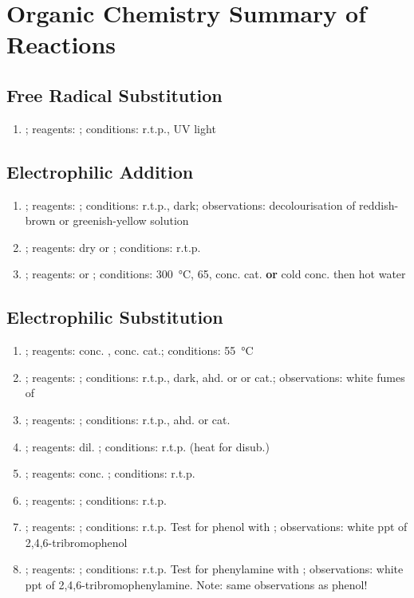 \chapter{Organic Chemistry Summary of Reactions}
\section{Free Radical Substitution}
\begin{enumerate}
    \item {}; reagents: ; conditions: r.t.p., UV light
\end{enumerate}
\section{Electrophilic Addition}
\begin{enumerate}
    \item {}; reagents: ; conditions: r.t.p., dark; observations: decolourisation of reddish-brown  or greenish-yellow  solution
    \item {}; reagents: dry  or ; conditions: r.t.p.
    \item {}; reagents:  or ; conditions: \SI{300}{\celsius}, \SI{65}{\atmosphere}, conc.  cat. \textbf{or} cold conc.  then hot water
\end{enumerate}
\section{Electrophilic Substitution}
\begin{enumerate}
    \item {}; reagents: conc. , conc.  cat.; conditions: \SI{55}{\celsius}
    \item {}; reagents: ; conditions: r.t.p., dark, ahd.  or  or  cat.; observations: white fumes of 
    \item {}; reagents: ; conditions: r.t.p., ahd.  or  cat.
    \item {}; reagents: dil. ; conditions: r.t.p. (heat for disub.)
    \item {}; reagents: conc. ; conditions: r.t.p.
    \item {}; reagents: ; conditions: r.t.p.
    \item {}; reagents: ; conditions: r.t.p. Test for phenol with ; observations: white ppt of 2,4,6-tribromophenol
    \item {}; reagents: ; conditions: r.t.p. Test for phenylamine with ; observations: white ppt of 2,4,6-tribromophenylamine. Note: same observations as phenol!
\end{enumerate}

